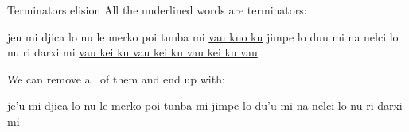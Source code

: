 \begin{frame}{Terminators elision}
    All the underlined words are terminators:

    \begin{center}
        je\textquotesingle u mi djica lo nu le merko poi tunba mi \underline{vau ku\textquotesingle o ku} jimpe lo du\textquotesingle u mi na nelci lo nu ri darxi mi \underline{vau kei ku vau kei ku vau kei ku vau}
    \end{center}

    We can remove all of them and end up with:
    \pause
    \begin{center}
        je'u mi djica lo nu le merko poi tunba mi jimpe lo du'u mi na nelci lo nu ri darxi mi
    \end{center}
\end{frame}
